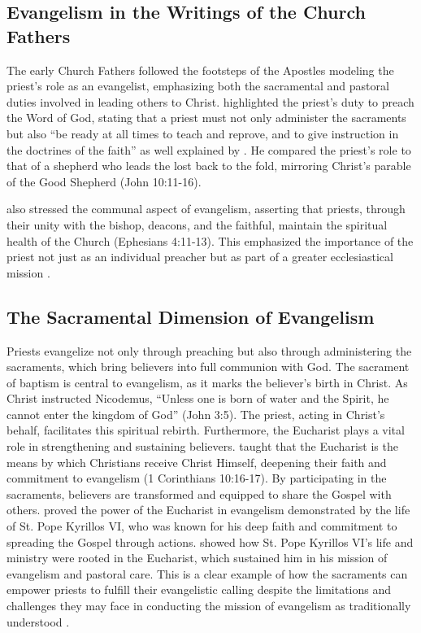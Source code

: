 \documentclass[12pt,doc]{apa7}   	%
\begin{document}
\subsection{Evangelism in the Writings of the Church Fathers}

The early Church Fathers followed the footsteps of the Apostles modeling the priest’s role as an evangelist, emphasizing both the sacramental and pastoral duties involved in leading others to Christ. \citet{priesthood_chrysostom} highlighted the priest’s duty to preach the Word of God, stating that a priest must not only administer the sacraments but also “be ready at all times to teach and reprove, and to give instruction in the doctrines of the faith” as well explained by \citeauthor{priesthood_chrysostom}. He compared the priest’s role to that of a shepherd who leads the lost back to the fold, mirroring Christ’s parable of the Good Shepherd (John 10:11-16).

\citet{epistles_ignatius} also stressed the communal aspect of evangelism, asserting that priests, through their unity with the bishop, deacons, and the faithful, maintain the spiritual health of the Church (Ephesians 4:11-13). This emphasized the importance of the priest not just as an individual preacher but as part of a greater ecclesiastical mission \citep{holmes_apostolic_fathers}.

\subsection{The Sacramental Dimension of Evangelism}

Priests evangelize not only through preaching but also through administering the sacraments, which bring believers into full communion with God. The sacrament of baptism is central to evangelism, as it marks the believer’s birth in Christ. As Christ instructed Nicodemus, “Unless one is born of water and the Spirit, he cannot enter the kingdom of God” (John 3:5). The priest, acting in Christ’s behalf, facilitates this spiritual rebirth.  Furthermore, the Eucharist plays a vital role in strengthening and sustaining believers. \citet{st_basil_letters} taught that the Eucharist is the means by which Christians receive Christ Himself, deepening their faith and commitment to evangelism (1 Corinthians 10:16-17). By participating in the sacraments, believers are transformed and equipped to share the Gospel with others.  \citet{fanous_silent_patriarch} proved the power of the Eucharist in evangelism demonstrated by the life of St. Pope Kyrillos VI, who was known for his deep faith and commitment to spreading the Gospel through actions.  \citeauthor{fanous_silent_patriarch} showed how St. Pope Kyrillos VI’s life and ministry were rooted in the Eucharist, which sustained him in his mission of evangelism and pastoral care.  This is a clear example of how the sacraments can empower priests to fulfill their evangelistic calling despite the limitations and challenges they may face in conducting the mission of evangelism as traditionally understood \citep{bebawi_pope_kyrillos}.
\end{document}

